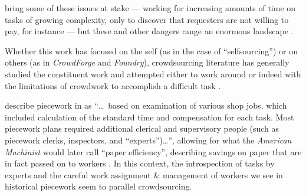 \documentclass[trackingWork]{subfiles}
\begin{document}
\citeauthor{professionalCrowdworkEthics} bring some of these issues at stake
--- working for increasing amounts of time on tasks of growing complexity, only to discover that requesters are not willing to pay,
for instance ---
but these and other dangers range an enormous landscape %
\cite{crowdworkFuture,professionalCrowdworkEthics,nickerson2013crowd,dynamo}.

Whether this work has focused on the self (as in the case of ``selfsourcing'')
or on others (as in \textit{CrowdForge} and \textit{Foundry}),
crowdsourcing literature has generally studied the constituent work
and attempted either to work around or indeed with the limitations of crowdwork to accomplish a difficult task
\cite{selfsourcingTeevan2014,selfsourcingTeevan2016,crowdForgeKittur,foundry}.


\citeauthor{10.2307/23702539} describe piecework in \citeyear{10.2307/23702539} as
``\dots~based on examination of various shop jobs,
which included calculation of the standard time and compensation for each task.
Most piecework plans required additional clerical and supervisory people
(such as piecework clerks, inspectors, and ``experts'')\dots'',
allowing for what the \textit{American Machinist} would later call ``paper efficiency'',
describing savings on paper that are in fact passed on to workers
\cite{10.2307/23702539}.
In this context,
the introspection of tasks by experts and the careful work assignment \& management of workers
we see in historical piecework seem to parallel crowdsourcing.
\end{document}
